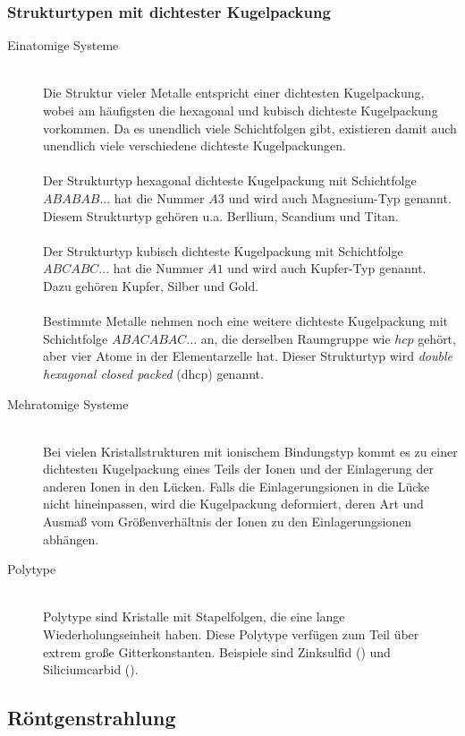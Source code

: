 \documentclass[a4paper,titlepage]{scrartcl}
\numberwithin{equation}{section}
\begin{document}
\subsubsection{Strukturtypen mit dichtester Kugelpackung \cite{wiki:kugelpackung}}
\begin{description}
\item[Einatomige Systeme] \hfill \\
Die Struktur vieler Metalle entspricht einer dichtesten Kugelpackung, wobei am häufigsten die hexagonal und kubisch dichteste Kugelpackung vorkommen. Da es unendlich viele Schichtfolgen gibt, existieren damit auch unendlich viele verschiedene dichteste Kugelpackungen.\\ \\
Der Strukturtyp hexagonal dichteste Kugelpackung mit Schichtfolge $ABABAB...$ hat die Nummer $A3$ und wird auch Magnesium-Typ genannt. Diesem Strukturtyp gehören u.a. Berllium, Scandium und Titan.\\\\
Der Strukturtyp kubisch dichteste Kugelpackung mit Schichtfolge $ABCABC...$ hat die Nummer $A1$ und wird auch Kupfer-Typ genannt. Dazu gehören Kupfer, Silber und Gold.\\ \\
Bestimmte Metalle nehmen noch eine weitere dichteste Kugelpackung mit Schichtfolge $ABACABAC...$ an, die derselben Raumgruppe wie $hcp$ gehört, aber vier Atome in der Elementarzelle hat. Dieser Strukturtyp wird \emph{double hexagonal closed packed} (dhcp) genannt.
\item[Mehratomige Systeme] \hfill \\
Bei vielen Kristallstrukturen mit ionischem Bindungstyp kommt es zu einer dichtesten Kugelpackung eines Teils der Ionen und der Einlagerung der anderen Ionen in den Lücken. Falls die Einlagerungsionen in die Lücke nicht hineinpassen, wird die Kugelpackung deformiert, deren Art und Ausmaß vom Größenverhältnis der Ionen zu den Einlagerungsionen abhängen.
\item[Polytype] \hfill \\
Polytype sind Kristalle mit Stapelfolgen, die eine lange Wiederholungseinheit haben. Diese Polytype verfügen zum Teil über extrem große Gitterkonstanten. Beispiele sind Zinksulfid () und Siliciumcarbid ().
\end{description}
\subsection{Röntgenstrahlung \cite{wiki:roentgenstrahlung} \cite{vorbereitungsMappe} \cite{wiki:roentgenstrahlung} \cite{wiki:bremsstrahlung} \cite{wiki:charakteristischeStrahlung}}
\end{document}
